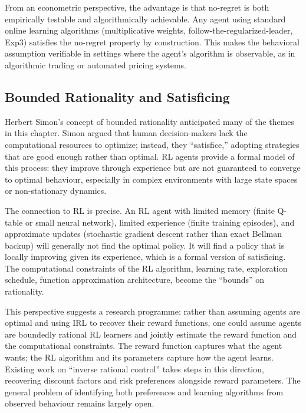From an econometric perspective, the advantage is that no-regret is both empirically testable and algorithmically achievable. Any agent using standard online learning algorithms (multiplicative weights, follow-the-regularized-leader, Exp3) satisfies the no-regret property by construction. This makes the behavioral assumption verifiable in settings where the agent's algorithm is observable, as in algorithmic trading or automated pricing systems.

\subsection{Bounded Rationality and Satisficing}

Herbert Simon's concept of bounded rationality \citep{Simon1957} anticipated many of the themes in this chapter. Simon argued that human decision-makers lack the computational resources to optimize; instead, they ``satisfice,'' adopting strategies that are good enough rather than optimal. RL agents provide a formal model of this process: they improve through experience but are not guaranteed to converge to optimal behaviour, especially in complex environments with large state spaces or non-stationary dynamics.

The connection to RL is precise. An RL agent with limited memory (finite Q-table or small neural network), limited experience (finite training episodes), and approximate updates (stochastic gradient descent rather than exact Bellman backup) will generally not find the optimal policy. It will find a policy that is locally improving given its experience, which is a formal version of satisficing. The computational constraints of the RL algorithm, learning rate, exploration schedule, function approximation architecture, become the ``bounds'' on rationality.

This perspective suggests a research programme: rather than assuming agents are optimal and using IRL to recover their reward functions, one could assume agents are boundedly rational RL learners and jointly estimate the reward function and the computational constraints. The reward function captures what the agent wants; the RL algorithm and its parameters capture how the agent learns. Existing work on ``inverse rational control'' \citep{Chan2019} takes steps in this direction, recovering discount factors and risk preferences alongside reward parameters. The general problem of identifying both preferences and learning algorithms from observed behaviour remains largely open.
